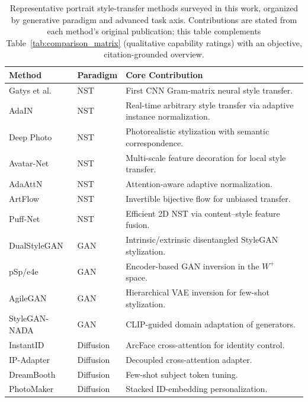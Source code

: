 \documentclass[journal]{IEEEtran}
\begin{document}
\begin{table}[t]
\centering
\caption{Representative portrait style-transfer methods surveyed in this work, organized by generative paradigm and advanced task axis. Contributions are stated from each method's original publication; this table complements Table~\ref{tab:comparison_matrix} (qualitative capability ratings) with an objective, citation-grounded overview.}
\label{tab:method_overview}
\small
\begin{tabular}{llp{9.0cm}}
\toprule
\textbf{Method} & \textbf{Paradigm} & \textbf{Core Contribution} \\
\midrule
Gatys et al. \cite{gatys2015ana} & NST & First CNN Gram-matrix neural style transfer. \\
AdaIN \cite{huang2017arbitraryst} & NST & Real-time arbitrary style transfer via adaptive instance normalization. \\
Deep Photo \cite{luan2017deepps} & NST & Photorealistic stylization with semantic correspondence. \\
Avatar-Net \cite{avatar-net} & NST & Multi-scale feature decoration for local style transfer. \\
AdaAttN \cite{liu2021adaattnra} & NST & Attention-aware adaptive normalization. \\
ArtFlow \cite{artflow} & NST & Invertible bijective flow for unbiased transfer. \\
Puff-Net \cite{zheng2024puffnet} & NST & Efficient 2D NST via content--style feature fusion. \\
\midrule
DualStyleGAN \cite{yang2022dualstylegan} & GAN & Intrinsic/extrinsic disentangled StyleGAN stylization. \\
pSp/e4e \cite{richardson2021encoding} & GAN & Encoder-based GAN inversion in the $W^+$ space. \\
AgileGAN \cite{song2021agilegan} & GAN & Hierarchical VAE inversion for few-shot stylization. \\
StyleGAN-NADA \cite{gal2021stylegannada} & GAN & CLIP-guided domain adaptation of generators. \\
\midrule
InstantID \cite{wang2024instantid} & Diffusion & ArcFace cross-attention for identity control. \\
IP-Adapter \cite{ye2023ipadapter} & Diffusion & Decoupled cross-attention adapter. \\
DreamBooth \cite{ruiz2023dreambooth} & Diffusion & Few-shot subject token tuning. \\
PhotoMaker \cite{li2024photomaker} & Diffusion & Stacked ID-embedding personalization. \\

\end{tabular}
\end{table}
\end{document}
